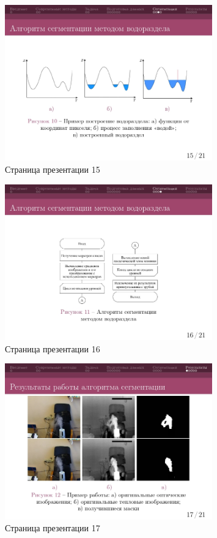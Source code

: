 \documentclass[14pt, a4paper]{extreport}
\begin{document}
	\begin{figure}[h!]
		\centering
		\includegraphics[width = 0.8\textwidth]{image/процентовка1_page-0015}	
		\caption{Страница презентации 15}
	\end{figure}
	\begin{figure}[h!]
		\centering
		\includegraphics[width = 0.8\textwidth]{image/процентовка1_page-0016}	
		\caption{Страница презентации 16}
	\end{figure}
	\begin{figure}[h!]
		\centering
		\includegraphics[width = 0.8\textwidth]{image/процентовка1_page-0017}	
		\caption{Страница презентации 17}
	\end{figure}
\end{document}
